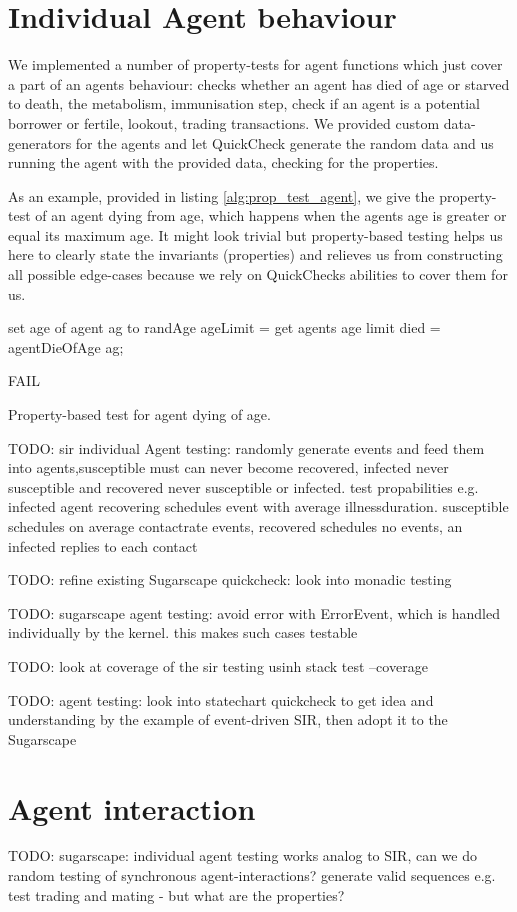 \section{Individual Agent behaviour}
We implemented a number of property-tests for agent functions which just cover a part of an agents behaviour: checks whether an agent has died of age or starved to death, the metabolism, immunisation step, check if an agent is a potential borrower or fertile, lookout, trading transactions. We provided custom data-generators for the agents and let QuickCheck generate the random data and us running the agent with the provided data, checking for the properties. 

As an example, provided in listing \ref{alg:prop_test_agent}, we give the property-test of an agent dying from age, which happens when the agents age is greater or equal its maximum age. It might look trivial but property-based testing helps us here to clearly state the invariants (properties) and relieves us from constructing all possible edge-cases because we rely on QuickChecks abilities to cover them for us.

\begin{algorithm}
set age of agent ag to randAge\;
ageLimit = get agents age limit\; 
died = agentDieOfAge ag;\

 {
  FAIL\;
}
\caption{Property-based test for agent dying of age.}
\end{algorithm}
\label{alg:prop_test_agent}


TODO: sir individual Agent testing: randomly generate events and feed them into agents,susceptible must can never become recovered, infected never susceptible and recovered never susceptible or infected. test propabilities e.g. infected agent recovering schedules event with average illnessduration. susceptible schedules on average contactrate events, recovered schedules no events, an infected replies to each contact

TODO: refine existing Sugarscape quickcheck: look into monadic testing

TODO: sugarscape agent testing: avoid error with ErrorEvent, which is handled individually by the kernel. this makes such cases testable

TODO: look at coverage of the sir testing usinh stack test --coverage

TODO: agent testing: look into statechart quickcheck to get idea and understanding by the example of event-driven SIR, then adopt it to the Sugarscape

\section{Agent interaction}

TODO: sugarscape: individual agent testing works analog to SIR, can we do random testing of synchronous agent-interactions? generate valid sequences e.g. test trading and mating - but what are the properties?